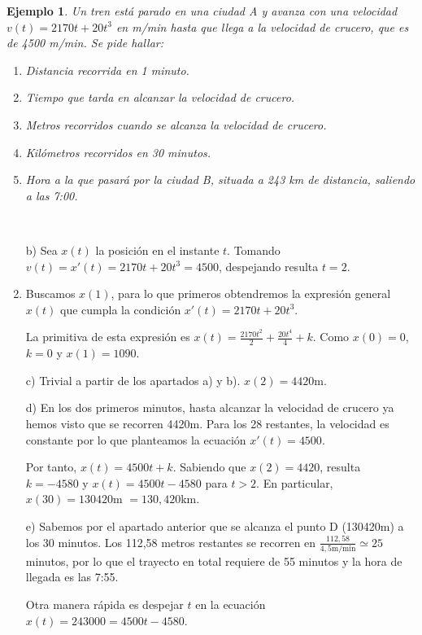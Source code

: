 \documentclass[11pt, a4paper,twoside]{article}
\makeatletter
\theoremstyle{theorem-style}  %
\renewenvironment{proof}[1][\proofname]{\par
	\pushQED{\qed}%
	\normalfont \topsep6\p@\@plus6\p@\relax
	\list{}{%
		\settowidth{\leftmargin}{\quad:\hskip\labelsep}%
		\setlength{\labelwidth}{0pt}%
		\setlength{\itemindent}{-\leftmargin}%
	}%
	\item[\hskip\labelsep\itshape#1\@addpunct{:}]\ignorespaces
}{%
	\popQED\endlist\@endpefalse
}
\theoremstyle{definition-style}
\theoremstyle{example-style}
\newtheorem{example}{Ejemplo}[section]
\makeatother
\begin{document}
\begin{example}
	Un tren está parado en una ciudad A y avanza con una velocidad $ v(t)=2170t+20t^3 $ en m/min hasta que llega a la velocidad de crucero, que es de 4500 m/min. Se pide hallar:
	\begin{enumerate}[\qquad a)]
		\item Distancia recorrida en 1 minuto.
		\item Tiempo que tarda en alcanzar la velocidad de crucero.
		\item Metros recorridos cuando se alcanza la velocidad de crucero.
		\item Kilómetros recorridos en 30 minutos.
		\item Hora a la que pasará por la ciudad B, situada a 243 km de distancia, saliendo a las 7:00.
	\end{enumerate}
\end{example}
\begin{proof}[Solución] \ 
	\begin{enumerate}[\qquad a)]
	\item[b)] Sea $x(t)$ la posición en el instante $t$. Tomando $v(t)=x'(t)=2170t+20t^3=4500$, despejando resulta $ t=2 $. 
	
	\item Buscamos $ x(1) $, para lo que primeros obtendremos la expresión general $ x(t) $ que cumpla la condición $ x'(t)=2170t+20t^3 $.
	
	La primitiva de esta expresión es $ x(t)=\frac{2170t^2}{2}+\frac{20t^4}{4}+k $. Como $ x(0)=0 $, $ k=0 $ y $ x(1)=1090 $.
	
	\item[c)] Trivial a partir de los apartados a) y b). $ x(2)=4420 $m.
	
	\item[d)] En los dos primeros minutos, hasta alcanzar la velocidad de crucero ya hemos visto que se recorren 4420m. Para los 28 restantes, la velocidad es constante por lo que planteamos la ecuación $ x'(t)=4500 $. 
	
	Por tanto, $ x(t)=4500t+k $. Sabiendo que $ x(2)=4420 $, resulta $ k=-4580 $ y $ x(t)=4500t-4580 $ para $ t>2 $. En particular, $ x(30)=130420 $m $ =130,420 $km.
	
	\item[e)] Sabemos por el apartado anterior que se alcanza el punto D (130420m) a los 30 minutos. Los 112,58 metros restantes se recorren en $ \frac{112,58}{4,5\text{m/min}}\simeq 25 $ minutos, por lo que el trayecto en total requiere de 55 minutos y la hora de llegada es las 7:55. 
	
	Otra manera rápida es despejar $ t $ en la ecuación $ x(t)= 243000=4500t-4580 $.
	\end{enumerate}
\end{proof}
\end{document}
